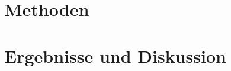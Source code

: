 
\chapter{Methoden} %
\label{cha:methoden}


\chapter{Ergebnisse und Diskussion} %
\label{cha:ergebnisse_und_diskussion}

